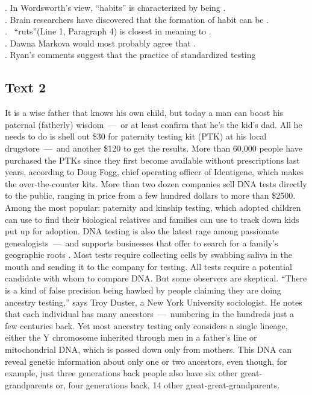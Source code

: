 \begin{questions} . In Wordsworth’s view, “habits” is characterized by being .
\\ . Brain researchers have discovered that the formation of habit can be .
\\ .  “ruts”(Line 1, Paragraph 4) is closest in meaning to .
\\ . Dawna Markova would most probably agree that .
\\ . Ryan’s comments suggest that the practice of standardized testing
\\ \end{questions}      \subsection{Text 2}
It is a wise father that knows his own child, but today a man can boost his paternal (fatherly) wisdom — or at least confirm that he’s the kid’s dad. All he needs to do is shell out \$30 for paternity testing kit (PTK) at his local drugstore — and another \$120 to get the results.
More than 60,000 people have purchased the PTKs since they
first become available without prescriptions last years, according to Doug Fogg, chief operating officer of Identigene, which makes the over-the-counter kits. More than two dozen companies sell DNA tests directly to the public, ranging in price from a few hundred dollars to more than \$2500.
Among the most popular: paternity and kinship testing, which adopted children can use to find their biological relatives and families can use to track down kids put up for adoption. DNA testing is also the latest rage among passionate genealogists — and supports businesses that offer to search for a family’s geographic roots .
Most tests require collecting cells by swabbing saliva in the mouth and sending it to the company for testing. All tests require a potential candidate with whom to compare DNA.
But some observers are skeptical. “There is a kind of false precision being hawked by people claiming they are doing ancestry testing,” says Troy Duster, a New York University sociologist. He notes that each individual has many ancestors — numbering in the hundreds just a few centuries back. Yet most ancestry testing only considers a single lineage, either the Y chromosome inherited through men in a father’s line or mitochondrial DNA, which is passed down only from mothers. This DNA can reveal genetic information about only one or two ancestors, even though, for example, just three generations back people also have six other great-grandparents or, four generations back, 14 other great-great-grandparents.
